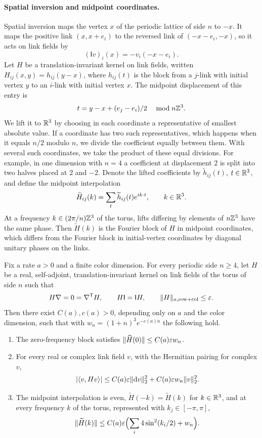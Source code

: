 \paragraph{Spatial inversion and midpoint coordinates.}
Spatial inversion maps the vertex $x$ of the periodic lattice of side $n$ to $-x$. It maps the positive link $(x,x+e_i)$ to the reversed link of $(-x-e_i,-x)$, so it acts on link fields by
\[
 (\mathsf Iv)_i(x)=-v_i(-x-e_i).
\]
Let $H$ be a translation-invariant kernel on link fields, written $H_{ij}(x,y)=h_{ij}(y-x)$, where $h_{ij}(t)$ is the block from a $j$-link with initial vertex $y$ to an $i$-link with initial vertex $x$. The midpoint displacement of this entry is
\[
 t=y-x+(e_j-e_i)/2\quad\bmod n\mathbb Z^3.
\]
We lift it to $\mathbb R^3$ by choosing in each coordinate a representative of smallest absolute value. If a coordinate has two such representatives, which happens when it equals $n/2$ modulo $n$, we divide the coefficient equally between them. With several such coordinates, we take the product of these equal divisions. For example, in one dimension with $n=4$ a coefficient at displacement $2$ is split into two halves placed at $2$ and $-2$. Denote the lifted coefficients by $\widetilde h_{ij}(t)$, $t\in\mathbb R^3$, and define the midpoint interpolation
\[
 \widetilde H_{ij}(k)=\sum_t\widetilde h_{ij}(t)e^{ik\cdot t},\qquad k\in\mathbb R^3.
\]
At a frequency $k\in(2\pi/n)\mathbb Z^3$ of the torus, lifts differing by elements of $n\mathbb Z^3$ have the same phase. Then $\widetilde H(k)$ is the Fourier block of $H$ in midpoint coordinates, which differs from the Fourier block in initial-vertex coordinates by diagonal unitary phases on the links.

\begin{lemma}\label{ch05:lem:ward-parity}
Fix a rate $a>0$ and a finite color dimension. For every periodic side $n\ge4$, let $H$ be a real, self-adjoint, translation-invariant kernel on link fields of the torus of side $n$ such that
\[
 H\nabla=0=\nabla^{\mathsf T}H,\qquad H\mathsf I=\mathsf IH,\qquad\lVert H\rVert_{a,\mathrm{row}+\mathrm{col}}\le\varepsilon.
\]
Then there exist $C(a),c(a)>0$, depending only on $a$ and the color dimension, such that with $w_n=(1+n)^3e^{-c(a)n}$ the following hold.
\begin{enumerate}
\item The zero-frequency block satisfies $\lVert \widehat H(0)\rVert\le C(a)\varepsilon w_n$.
\item For every real or complex link field $v$, with the Hermitian pairing for complex $v$,
\[
 \lvert \langle v,Hv\rangle\rvert\le C(a)\varepsilon\lVert \mathrm dv\rVert_2^2+C(a)\varepsilon w_n\lVert v\rVert_2^2.
\]
\item The midpoint interpolation is even, $\widetilde H(-k)=\widetilde H(k)$ for $k\in\mathbb R^3$, and at every frequency $k$ of the torus, represented with $k_j\in[-\pi,\pi]$,
\[
 \lVert \widetilde H(k)\rVert\le C(a)\varepsilon\Bigl(\sum_i4\sin^2(k_i/2)+w_n\Bigr).
\]
\end{enumerate}
\end{lemma}

